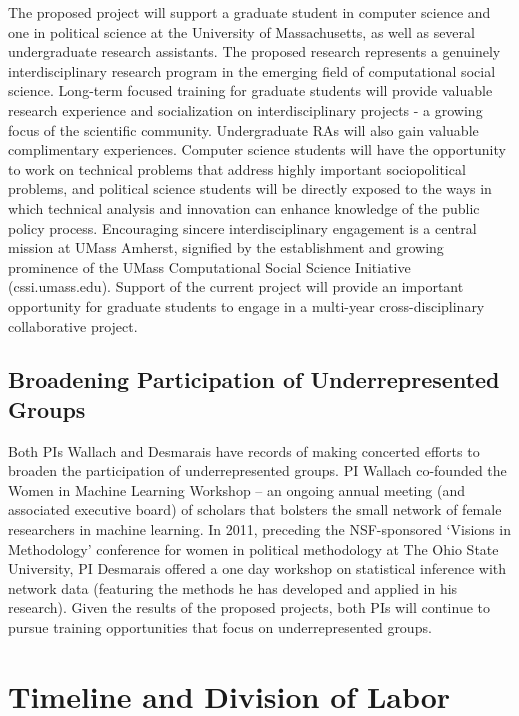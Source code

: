 The proposed project will support a graduate student in computer science and one in political science at the University of Massachusetts, as well as several undergraduate research assistants.  The proposed research represents a genuinely interdisciplinary research program in the emerging field of computational social science. Long-term focused training for graduate students will provide valuable research experience and socialization on interdisciplinary projects - a growing focus of the scientific community. Undergraduate RAs will also gain valuable complimentary experiences. Computer science students will have the opportunity to work on technical problems that address highly important sociopolitical problems, and political science students will be directly exposed to the ways in which technical analysis and innovation can enhance knowledge of the public policy process. Encouraging sincere interdisciplinary engagement is a central mission at UMass Amherst, signified by the establishment and growing prominence of the UMass Computational Social Science Initiative (cssi.umass.edu). Support of the current project will provide an important opportunity for graduate students to engage in a multi-year cross-disciplinary collaborative project.

\subsection{Broadening Participation of Underrepresented Groups}

Both PIs Wallach and Desmarais have records of making concerted
efforts to broaden the participation of underrepresented groups. PI
Wallach co-founded the Women in Machine Learning Workshop -- an
ongoing annual meeting (and associated executive board) of scholars
that bolsters the small network of female researchers in machine
learning. In 2011, preceding the NSF-sponsored `Visions in
Methodology' conference for women in political methodology at The Ohio
State University, PI Desmarais offered a one day workshop on
statistical inference with network data (featuring the methods he has
developed and applied in his research). Given the results of the
proposed projects, both PIs will continue to pursue training
opportunities that focus on underrepresented groups.




\section{Timeline and Division of Labor}  \vspace{-.2cm}

